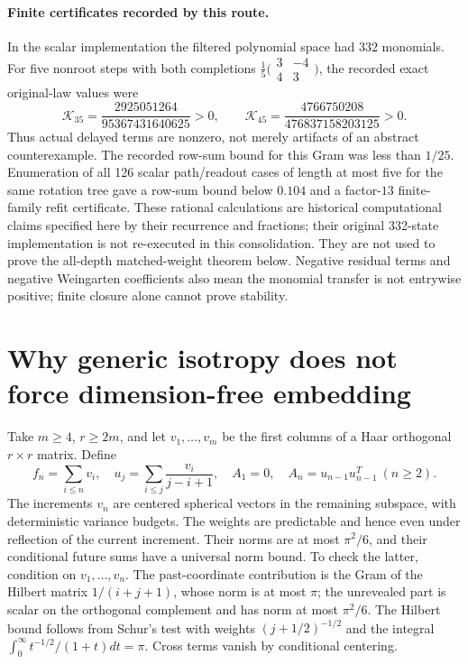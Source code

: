 \documentclass[11pt,oneside,openany,a4paper]{book}
\numberwithin{equation}{chapter}
\theoremstyle{definition}
\theoremstyle{remark}
\begin{document}
\paragraph{Finite certificates recorded by this route.}
In the scalar implementation the filtered polynomial space had 332 monomials. For five nonroot steps with both completions $\frac15\bigl(\begin{smallmatrix}3&-4\\4&3\end{smallmatrix}\bigr)$, the recorded exact original-law values were
\[
 \mathcal K_{35}=\frac{2925051264}{95367431640625}>0,\qquad
 \mathcal K_{45}=\frac{4766750208}{476837158203125}>0.
\]
Thus actual delayed terms are nonzero, not merely artifacts of an abstract counterexample. The recorded row-sum bound for this Gram was less than $1/25$. Enumeration of all 126 scalar path/readout cases of length at most five for the same rotation tree gave a row-sum bound below $0.104$ and a factor-$13$ finite-family refit certificate. These rational calculations are historical computational claims specified here by their recurrence and fractions; their original 332-state implementation is not re-executed in this consolidation. They are not used to prove the all-depth matched-weight theorem below. Negative residual terms and negative Weingarten coefficients also mean the monomial transfer is not entrywise positive; finite closure alone cannot prove stability.

\section{Why generic isotropy does not force dimension-free embedding}\label{base:new:abstract-obstruction}
Take $m\ge4$, $r\ge2m$, and let $v_1,\ldots,v_m$ be the first columns of a Haar orthogonal $r\times r$ matrix. Define
\[
 f_n=\sum_{i\le n}v_i,\quad
 u_j=\sum_{i\le j}\frac{v_i}{j-i+1},\quad
 A_1=0,\quad A_n=u_{n-1}u_{n-1}^T\ (n\ge2).
\]
The increments $v_n$ are centered spherical vectors in the remaining subspace, with deterministic variance budgets. The weights are predictable and hence even under reflection of the current increment. Their norms are at most $\pi^2/6$, and their conditional future sums have a universal norm bound. To check the latter, condition on $v_1,\ldots,v_n$. The past-coordinate contribution is the Gram of the Hilbert matrix $1/(i+j+1)$, whose norm is at most $\pi$; the unrevealed part is scalar on the orthogonal complement and has norm at most $\pi^2/6$. The Hilbert bound follows from Schur's test with weights $(j+1/2)^{-1/2}$ and the integral $\int_0^\infty t^{-1/2}/(1+t)dt=\pi$. Cross terms vanish by conditional centering.
\end{document}
